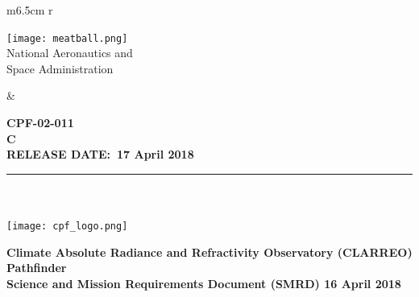 \documentclass[12pt,oneside,oldfontcommands]{memoir}
\date[\mydate]{\today}
\title{\mycpftitle}
\author{\myauthor}
\date{\mydate}
\def\mytitle{Title}
\def\mytitle{Science and Mission Requirements Document (SMRD)}
\def\mydate{16 April 2018}
\def\releasedate{17 April 2018}
\def\documentnumber{CPF-02-011}
\def\titlepagerevision{REV. C}
\def\revision{C  }
\def\titlepagerevision{\revision}
\begin{document}


\mainmatter
\VerbatimFootnotes


%
%
\captionnamefont{\small\sffamily}
\captiontitlefont{\small\sffamily}
\renewcommand\thefigure{\thesection-\arabic{figure}} 
\renewcommand\thetable{\thesection-\arabic{table}}
%
%

% 

\thispagestyle{firststyle}
\sffamily
\setlength\voffset{-18pt}
\setlength{\floatsep}{10pt plus 1.0pt minus 2.0pt}
\vspace{-0.25in}
\begin{table}[h!]
  \begin{tabular}{ m{6.5cm} r }
    \begin{minipage}{4in}
      \texttt{[image: meatball.png]}\\
        \textsf{\noindent
        \footnotesize{National Aeronautics and\\
        \vspace{-5pt}Space Administration}
        }

    \end{minipage}
    &
    \begin{minipage}[t]{10cm}
    \vspace{0.3in}
    \sffamily
    \raggedleft\Large\bfseries \documentnumber\\
    \normalsize \MakeUppercase \titlepagerevision\\
    \raggedleft\bfseries
    RELEASE DATE:~\MakeTextUppercase\releasedate
    \end{minipage}
  \end{tabular}
\end{table}
\vspace{-0.3in}
\rule{\linewidth}{2.25pt}
~\\
~\\
\vspace{0.42in}
\centering
\texttt{[image: cpf\_logo.png]}

\Large\bfseries
	Climate Absolute Radiance and Refractivity Observatory (CLARREO) Pathfinder \\
\vspace{0.4in}
\mytitle
\normalsize
\vspace{0.25in}
\mydate \\
\normalfont
\vspace{0.05in}
\clearpage
\end{document}
